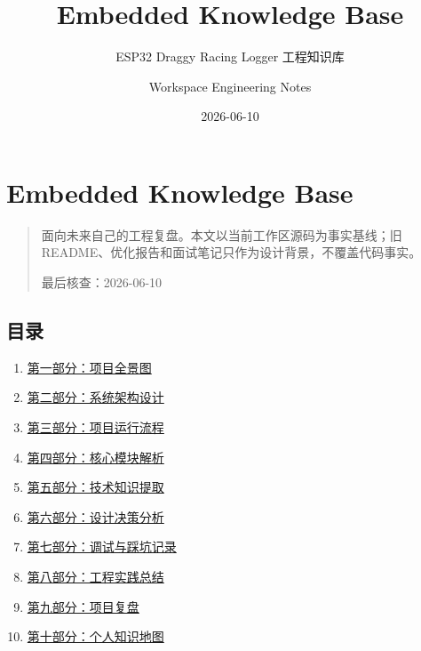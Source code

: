 \documentclass[
  UTF8,11pt,a4paper]{ctexart}
\title{Embedded Knowledge Base}
\subtitle{ESP32 Draggy Racing Logger 工程知识库}
\author{Workspace Engineering Notes}
\date{2026-06-10}
\providecommand{\tightlist}{%
  \setlength{\itemsep}{0pt}\setlength{\parskip}{0pt}}
\begin{document}
\maketitle

{
\setcounter{tocdepth}{3}
\tableofcontents
}
\section{Embedded Knowledge Base}\label{embedded-knowledge-base}

\begin{quote}
面向未来自己的工程复盘。本文以当前工作区源码为事实基线；旧
README、优化报告和面试笔记只作为设计背景，不覆盖代码事实。

最后核查：2026-06-10
\end{quote}

\subsection{目录}\label{ux76eeux5f55}

\begin{enumerate}
\def\labelenumi{\arabic{enumi}.}
\tightlist
\item
  \hyperref[ux7b2cux4e00ux90e8ux5206ux9879ux76eeux5168ux666fux56fe]{第一部分：项目全景图}
\item
  \hyperref[ux7b2cux4e8cux90e8ux5206ux7cfbux7edfux67b6ux6784ux8bbeux8ba1]{第二部分：系统架构设计}
\item
  \hyperref[ux7b2cux4e09ux90e8ux5206ux9879ux76eeux8fd0ux884cux6d41ux7a0b]{第三部分：项目运行流程}
\item
  \hyperref[ux7b2cux56dbux90e8ux5206ux6838ux5fc3ux6a21ux5757ux89e3ux6790]{第四部分：核心模块解析}
\item
  \hyperref[ux7b2cux4e94ux90e8ux5206ux6280ux672fux77e5ux8bc6ux63d0ux53d6]{第五部分：技术知识提取}
\item
  \hyperref[ux7b2cux516dux90e8ux5206ux8bbeux8ba1ux51b3ux7b56ux5206ux6790]{第六部分：设计决策分析}
\item
  \hyperref[ux7b2cux4e03ux90e8ux5206ux8c03ux8bd5ux4e0eux8e29ux5751ux8bb0ux5f55]{第七部分：调试与踩坑记录}
\item
  \hyperref[ux7b2cux516bux90e8ux5206ux5de5ux7a0bux5b9eux8df5ux603bux7ed3]{第八部分：工程实践总结}
\item
  \hyperref[ux7b2cux4e5dux90e8ux5206ux9879ux76eeux590dux76d8]{第九部分：项目复盘}
\item
  \hyperref[ux7b2cux5341ux90e8ux5206ux4e2aux4ebaux77e5ux8bc6ux5730ux56fe]{第十部分：个人知识地图}
\end{enumerate}
\end{document}
